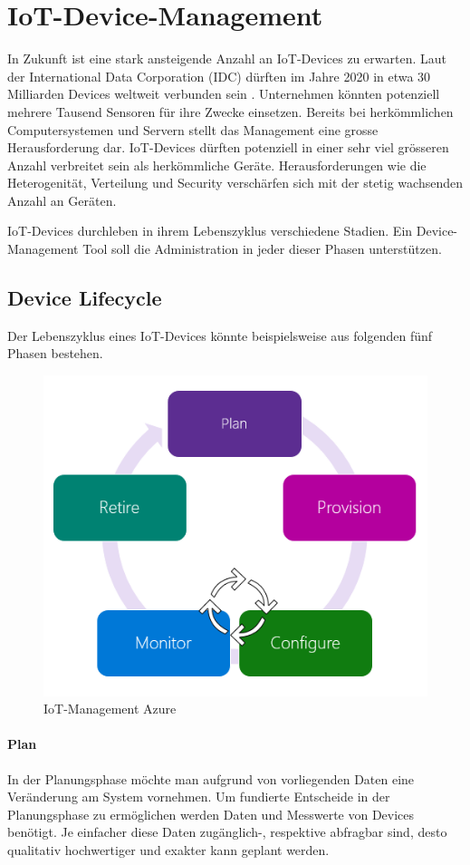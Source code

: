 \chapter{IoT-Device-Management}
\label{sec:devmgmt}
In Zukunft ist eine stark ansteigende Anzahl an IoT-Devices zu erwarten. Laut der International Data Corporation (IDC) dürften im Jahre 2020 in etwa 30 Milliarden Devices weltweit verbunden sein \cite{IDC15}. Unternehmen könnten potenziell mehrere Tausend Sensoren für ihre Zwecke einsetzen. Bereits bei herkömmlichen Computersystemen und Servern stellt das Management eine grosse Herausforderung dar. IoT-Devices dürften potenziell in einer sehr viel grösseren Anzahl verbreitet sein als herkömmliche Geräte. Herausforderungen wie die Heterogenität, Verteilung und Security verschärfen sich mit der stetig wachsenden Anzahl an Geräten. 

IoT-Devices durchleben in ihrem Lebenszyklus verschiedene Stadien. Ein Device-Management Tool soll die Administration in jeder dieser Phasen unterstützen.
\section{Device Lifecycle}
Der Lebenszyklus eines IoT-Devices könnte beispielsweise aus folgenden fünf Phasen bestehen.
\begin{figure}[H]
\centering
\includegraphics[scale=0.5]{../02_Analyse/images/hubdevmgmt-azure.png}
\caption{IoT-Management Azure \cite{IoTMgmtAzure}}
\end{figure}
\subsubsection{Plan}
In der Planungsphase möchte man aufgrund von vorliegenden Daten eine Veränderung am System vornehmen. Um fundierte Entscheide in der Planungsphase zu ermöglichen werden Daten und Messwerte von Devices benötigt. Je einfacher diese Daten zugänglich-, respektive abfragbar sind, desto qualitativ hochwertiger und exakter kann geplant werden.
